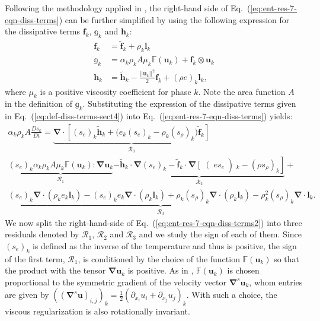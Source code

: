 \documentclass[preprint,10pt]{elsarticle}
\renewcommand{\div}{\mbold{\nabla}\! \cdot \!}
\newcommand{\grad}{\mbold{\nabla}}
\newcommand{\mbold}[1]{\boldsymbol#1}
\newcommand{\eqt}[1]{Eq.~(\ref{#1})}                     %
\begin{document}
Following the methodology applied in \cite{jlg, Marco_paper_low_mach}, the right-hand side of \eqt{eq:ent-res-7-eqn-diss-terms} can be further simplified by using the following expression
for the dissipative terms $\mbold f_k$,  $\mathbb{g}_k$ and $\mbold h_k$:
%
\begin{subequations}\label{eq:def-diss-terms-sect4}
\begin{align}
  \mbold f_k &= \tilde{\mbold f}_k + \rho_k \mbold  l_k 
  \\
  \mathbb{g}_k &= \alpha_k \rho_k A \mu_k \mathbb{F}(\mbold u_k) + \mbold f_k \otimes \mbold u_k
  \\
  \mbold h_k &= \tilde{\mbold h}_k - \frac{|| \mbold u_k||^2 }{2} \mbold f_k + (\rho e)_k \mbold l_k,
\end{align}
\end{subequations}
%
where $\mu_k$ is a positive viscosity coefficient for phase $k$. Note the area function $A$ in the definition of $\mathbb{g}_k$. Substituting the expression of the dissipative terms given in \eqt{eq:def-diss-terms-sect4} into \eqt{eq:ent-res-7-eqn-diss-terms} yields:
%
\begin{multline}\label{eq:ent-res-7-eqn-diss-terms2}
\alpha_k \rho_k A \frac{Ds_k}{Dt} = \underbrace{\div \left[ (s_e)_k\tilde{\mbold h}_k + \Big( e_k( s_e)_k - \rho_k (s_\rho)_k \Big) \tilde{\mbold f}_k \right]}_{{\mathcal{R}_0}} \\
\underbrace{ \left(s_e\right)_k \alpha_k \rho_k A \mu_k \mathbb{F}(\mbold u_k) : \grad \mbold u_k}_{\mathcal{R}_1} 
\underbrace{-\tilde{\mbold h}_k \cdot \grad (s_e)_k  - \tilde{\mbold f}_k \cdot \grad \left[ \right( e s_e \left)_k - (\rho s_\rho)_k \right]}_{\mathcal{R}_2} + \\
\underbrace{(s_e)_k \div \left( \rho_k e_k \mbold l_k \right) -  (s_e)_k e_k \div \left( \rho_k \mbold l_k \right) + \rho_k (s_\rho)_k \div \left( \rho_k \mbold l_k \right) 
  - \rho_k^2 (s_\rho)_k \div \mbold l_k}_{\mathcal{R}_3}.
\end{multline}
%
We now split the right-hand-side of \eqt{eq:ent-res-7-eqn-diss-terms2} into three residuals denoted by $\mathcal{R}_1$, $\mathcal{R}_2$ and $\mathcal{R}_3$ and we study the sign of each of them. Since $(s_e)_k$ is defined as the inverse of the temperature and thus is positive, the sign of the first term, $\mathcal{R}_1$, is conditioned by the choice of the function $\mathbb{F}(\mbold u_k)$ so that the product with the tensor $\grad \mbold u_k$ is positive. As in \cite{jlg, Marco_paper_low_mach}, $\mathbb{F}(\mbold u_k)$ is chosen proportional to the symmetric gradient of the velocity vector $\grad^s \mbold u_k$, whom entries are given by $\left( (\grad^s \mbold u)_{i,j} \right)_k = \frac{1}{2} \left( \partial_{x_i} u_i + \partial_{x_j} u_j \right)_k$. With such a choice, the viscous regularization is also rotationally invariant.
\end{document}
